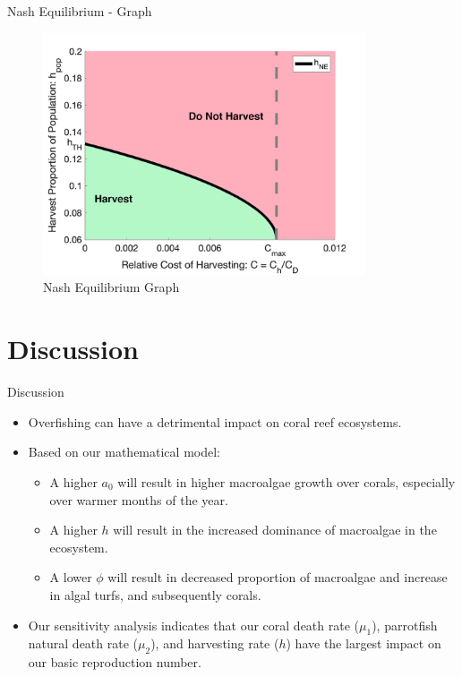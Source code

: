 \documentclass{beamer}
\begin{document}
\begin{frame}{Nash Equilibrium - Graph}
    \begin{figure}
        \centering
        \includegraphics[width = 0.85\textwidth]{Latex/Figures/Graphs/nash_1.png}
        \caption{Nash Equilibrium Graph}
        \label{fig:NE_Graph}
    \end{figure}
\end{frame}



\section{Discussion}
\begin{frame}{Discussion}
    \begin{itemize}
        \item<1-> Overfishing can have a detrimental impact on coral reef ecosystems.
        \item<2-> Based on our mathematical model:
            \begin{itemize}
                \item A higher $a_{0}$ will result in higher macroalgae growth over corals, especially over warmer months of the year.
                \item A higher $h$ will result in the increased dominance of macroalgae in the ecosystem.
                \item A lower $\phi$ will result in decreased proportion of macroalgae and increase in algal turfs, and subsequently corals.
            \end{itemize}
        \item<3-> Our sensitivity analysis indicates that our coral death rate ($\mu_{1}$), parrotfish natural death rate ($\mu_{2}$), and harvesting rate ($h$) have the largest impact on our basic reproduction number.
    \end{itemize}
\end{frame}
\end{document}
